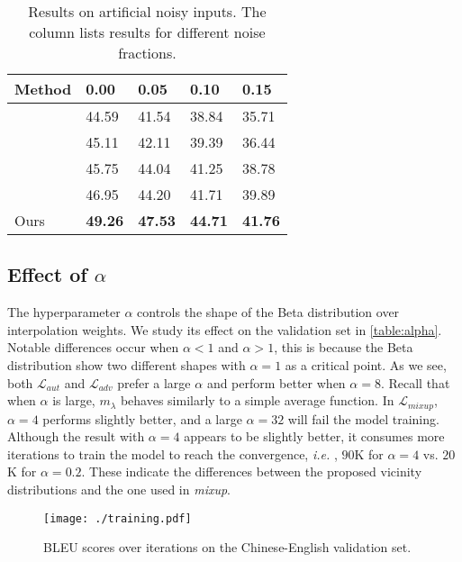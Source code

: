 \documentclass[11pt,a4paper]{article}
\newcommand{\ie}{\emph{i.e. }} \newcommand{\Ie}{\emph{I.e}}
\newcommand{\mixup}{\textit{mixup}\xspace}
\begin{document}
\begin{table}[!t]
\centering
\setlength\tabcolsep{4.5pt}
\begin{tabular}{l|l|l|l|l}
\hline
Method &0.00 &0.05 &0.10 &0.15 \\
\hline \hline
\citeauthor{Vaswani:17} &44.59 &41.54 &38.84 &35.71\\
\citeauthor{Miyato:17} &45.11 &42.11 &39.39 &36.44\\
\citeauthor{Sano:19} &45.75 &44.04 &41.25 &38.78\\
\citeauthor{Cheng:19} &46.95 &44.20 &41.71 &39.89\\
\hline
Ours &\textbf{49.26} &\textbf{47.53} &\textbf{44.71} &\textbf{41.76}\\
\hline
\end{tabular}
\caption{Results on artificial noisy inputs. The column lists results for different noise fractions.}
\label{table:robust}
\end{table}

\subsection{Effect of $\alpha$}
The hyperparameter $\alpha$ controls the shape of the Beta distribution over interpolation weights. 
We study its effect on the validation set in \autoref{table:alpha}.
Notable differences occur when $\alpha < 1$ and $\alpha > 1$, this is because the Beta distribution show two different shapes with $\alpha = 1$ as a critical point. 
As we see, both $\mathcal{L}_{aut}$ and $\mathcal{L}_{adv}$ prefer a large $\alpha$ and perform better when $\alpha=8$. Recall that when $\alpha$ is large, $m_{\lambda}$ behaves similarly to a simple average function. 
In $\mathcal{L}_{mixup}$, $\alpha=4$ performs slightly better, and a large $\alpha=32$ will fail the model training. Although the result with $\alpha=4$ appears to be slightly better, it consumes more iterations to train the model to reach the convergence, \ie, $90$K for $\alpha=4$ vs. $20$K for $\alpha=0.2$. These indicate the differences between the proposed vicinity distributions and the one used in \mixup. 

\begin{figure}[!t]
\centering
\texttt{[image: ./training.pdf]} 
\caption{BLEU scores over iterations on the Chinese-English validation set.}
\label{fig:training_curve}
\end{figure}
\end{document}
